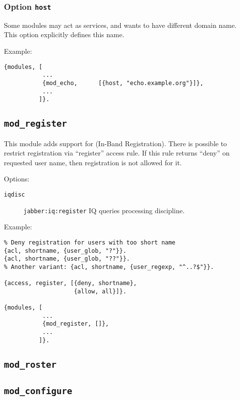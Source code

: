 \documentclass[10pt]{article}
\newcommand{\ns}[1]{\texttt{#1}}
\newcommand{\modregister}{\texttt{mod\_register}}
\newcommand{\modroster}{\texttt{mod\_roster}}
\newcommand{\modconfigure}{\texttt{mod\_configure}}
\begin{document}
\subsubsection{Option \texttt{host}}

Some modules may act as services, and wants to have different domain name.
This option explicitly defines this name.

Example:
\begin{verbatim}
{modules, [
           ...
           {mod_echo,      [{host, "echo.example.org"}]},
           ...
          ]}.
\end{verbatim}



\subsection{\modregister{}}
\label{sec:modregister}

This module adds support for
 (In-Band
Registration).  There is possible to restrict registration via ``register''
access rule.  If this rule returns ``deny'' on requested user name, then
registration is not allowed for it.

Options:
\begin{description}
\item[\texttt{iqdisc}] \ns{jabber:iq:register} IQ queries processing
  discipline.
\end{description}

Example:
\begin{verbatim}
% Deny registration for users with too short name
{acl, shortname, {user_glob, "?"}}.
{acl, shortname, {user_glob, "??"}}.
% Another variant: {acl, shortname, {user_regexp, "^..?$"}}.

{access, register, [{deny, shortname},
                    {allow, all}]}.

{modules, [
           ...
           {mod_register, []},
           ...
          ]}.
\end{verbatim}




\subsection{\modroster{}}
\label{sec:modroster}



\subsection{\modconfigure{}}
\label{sec:modconfigure}
\end{document}
